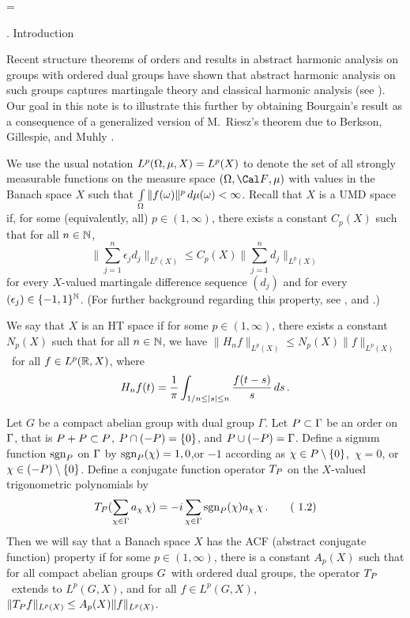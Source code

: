 \def\prf{ \noindent {\it Proof.}\ \ }
\def\endprf{\hfill $\blacksquare$}
 
\loadmsbm
\loadeusm
\magnification=
\baselineskip=21pt
\CenteredTagsOnSplits
 
 
. Introduction \endspecialhead
 
Recent structure theorems of orders and results in abstract
harmonic analysis on groups with ordered dual groups have
shown that abstract harmonic analysis on such groups
captures martingale theory and classical 
harmonic analysis (see \cite{4}).
Our goal in this note is to illustrate this further by obtaining
Bourgain's result \cite{6} as a consequence of a generalized
version of M.\ Riesz's theorem due to 
Berkson, Gillespie, and Muhly \cite{5}.
 
We use the usual notation $L^p({\Omega},\mu,X)=L^{p}(X)$ to
denote the set of all strongly measurable functions on the
measure space $(\msp,\malg,\mu)$ with values in the Banach
space $X$ such that
$\int\limits_\Omega\|f(\omega)\|^p\,d\mu(\omega)<\infty$.  Recall
that $X$ is a UMD space if, for some (equivalently, all) $
p\in(1,\infty)$,
there exists a constant $C_p(X)$ such that for all $n\in
{\Bbb N}$,
$$ \big\| \sum_{j=1}^n \epsilon_j d_j \big\|_{L^p(X)}\leq
C_p(X)\big\| \sum_{j=1}^n d_j \big\|_{L^p(X)}\tag{1.1}$$
for every $X$-valued martingale difference sequence $(d_j)$
and for every $(\epsilon_j)\in\{-1,1\}^{\Bbb N}$. (For further 
background regarding this property, see \cite{7}, \cite{8} 
and \cite{9}.)
 
We say that $X$ is an HT space if for some
$p\in(1,\infty)$, there exists a constant $N_p(X)$ such that
for all $n \in \Bbb N$, we have
$ \|H_n f\|_{L^p(X)} \le N_p(X) \| f \|_{L^p(X)} $\ for all
$f \in L^p(\Bbb R,X)$, where
$$ H_n f(t) = {1\over \pi }\int_{1/n \le |s| \le n} {f(t-s)\over s}
\, ds \,.$$
 
Let $G$ be a compact abelian group with dual group $\Gamma$.
Let $P\subset\Gamma$ be an order on $\Gamma$, that is
$P+P\subset P$, $P\cap(-P)=\{0 \}$, and
$P\cup(-P)=\Gamma$. Define a signum function $\text{sgn}_P$ on
$\Gamma$ by
$\text{sgn}_P(\chi)=1,0$,or $-1$ according 
as $\chi\in P\setminus\{0\}$,\ $\chi=0$, or  $\chi\in(-P)\setminus\{0\}$.
Define a conjugate function operator $T_P$ on the $X$-valued
trigonometric polynomials by
$$T_P(\sum\limits_{\chi\in\Gamma}a _\chi\,\chi) =-
i\sum\limits_{\chi\in\Gamma}\text{sgn}_P(\chi) a _\chi\,\chi\,.
\tag{ 1.2}$$
Then we will say that a Banach space $X$ has the ACF
(abstract conjugate function) property if for some $p \in
(1,\infty)$, there is a constant $A_p(X)$ such that for all
compact abelian groups $G$\ with ordered dual groups, the operator
$T_P$\ extends to $L^p(G,X)$, and  for 
all $f \in L^p(G,X)$, $ \|T_P f\|_{L^p(X)}
\le A_p(X) \| f \|_{L^p(X)} $.
 
